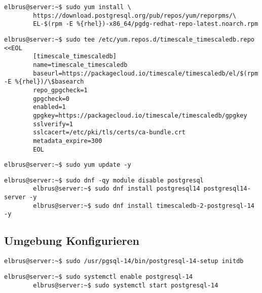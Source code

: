 	\lstset{style=commands}
	\begin{lstlisting}[caption={Hinzufügen des PostgreSQL Drittanbieter-Repository, um die neuesten PostgreSQL-Pakete zu erhalten.}]
		elbrus@server:~$ sudo yum install \
		https://download.postgresql.org/pub/repos/yum/reporpms/\
		EL-$(rpm -E %{rhel})-x86_64/pgdg-redhat-repo-latest.noarch.rpm
	\end{lstlisting}
	
	\lstset{style=commands}
	\begin{lstlisting}[caption={Erstellen des Timescale repository.}]
		elbrus@server:~$ sudo tee /etc/yum.repos.d/timescale_timescaledb.repo <<EOL
		[timescale_timescaledb]
		name=timescale_timescaledb
		baseurl=https://packagecloud.io/timescale/timescaledb/el/$(rpm -E %{rhel})/\$basearch
		repo_gpgcheck=1
		gpgcheck=0
		enabled=1
		gpgkey=https://packagecloud.io/timescale/timescaledb/gpgkey
		sslverify=1
		sslcacert=/etc/pki/tls/certs/ca-bundle.crt
		metadata_expire=300
		EOL
	\end{lstlisting}
	
	\lstset{style=commands}
	\begin{lstlisting}[caption={Updaten der lokalen Package-Liste.}]
		elbrus@server:~$ sudo yum update -y
	\end{lstlisting}
	
	\lstset{style=commands}
	\begin{lstlisting}[caption={Installieren von TimescaleDB.}]
		elbrus@server:~$ sudo dnf -qy module disable postgresql
		elbrus@server:~$ sudo dnf install postgresql14 postgresql14-server -y
		elbrus@server:~$ sudo dnf install timescaledb-2-postgresql-14 -y
	\end{lstlisting}
	\newpage
	
	\subsection[TimescaleDB konfigurieren]{Umgebung Konfigurieren}
	
	\lstset{style=commands}
	\begin{lstlisting}[caption={Initialisieren der Datenbank.}]
		elbrus@server:~$ sudo /usr/pgsql-14/bin/postgresql-14-setup initdb
	\end{lstlisting}
	
	\lstset{style=commands}
	\begin{lstlisting}[caption={Verknüpfen von 'postgresql' Serive Start mit Serverstart sowie den Service starten.}]
		elbrus@server:~$ sudo systemctl enable postgresql-14
		elbrus@server:~$ sudo systemctl start postgresql-14
	\end{lstlisting}
	
